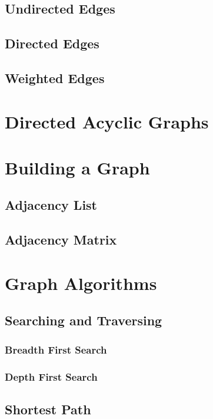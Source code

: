 \documentclass[10pt,a4paper]{book}
\begin{document}
\subsection{Undirected Edges}

\subsection{Directed Edges}

\subsection{Weighted Edges}

\section{Directed Acyclic Graphs}


\section{Building a Graph}

\subsection{Adjacency List}
\subsection{Adjacency Matrix}


\section{Graph Algorithms}

\subsection{Searching and Traversing}

\subsubsection{Breadth First Search}

\subsubsection{Depth First Search}


\subsection{Shortest Path}
\end{document}
